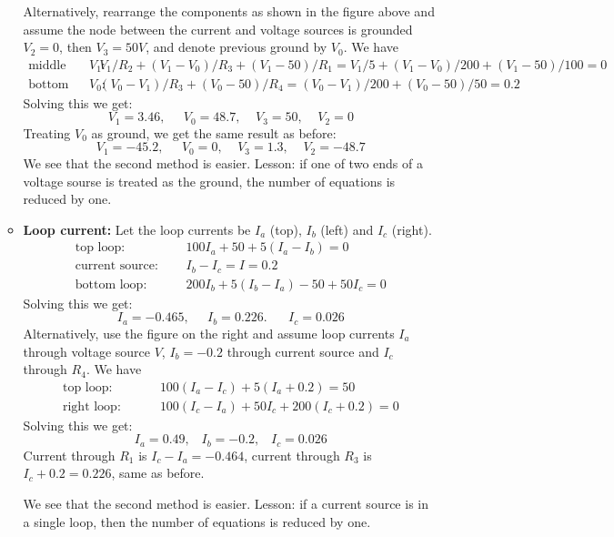 \begin{enumerate}
\begin{itemize}
    Alternatively, rearrange the components as shown in the figure 
    above and assume the node between the current and voltage sources
    is grounded $V_2=0$, then $V_3=50V$, and denote previous ground by
    $V_0$. We have 
    \[
    \begin{array}{ll}
      \mbox{middle node $V_1$:} & 
      V_1/R_2+(V_1-V_0)/R_3+(V_1-50)/R_1
      =V_1/5+(V_1-V_0)/200+(V_1-50)/100=0\\
      \mbox{bottom node $V_0$:} & (V_0-V_1)/R_3+(V_0-50)/R_4
      =(V_0-V_1)/200+(V_0-50)/50=0.2 
    \end{array} 
    \]
    Solving this we get: 
    \[
    V_1=3.46,\;\;\;\;\;V_0=48.7,\;\;\;\;V_3=50,\;\;\;\;V_2=0
    \]
    Treating $V_0$ as ground, we get the same result as before: 
    \[
    V_1=-45.2,\;\;\;\;\;V_0=0,\;\;\;\;V_3=1.3,\;\;\;\;V_2=-48.7 
    \]
    We see that the second method is easier. Lesson: if one of two ends 
    of a voltage sourse is treated as the ground, the number of equations 
    is reduced by one.
  \item {\bf Loop current:} Let the loop currents be $I_a$ (top), 
    $I_b$ (left) and $I_c$ (right). 
    \[
    \begin{array}{ll}
      \mbox{top loop:}\;\;\;\;\;\;& 100I_a+50+5(I_a-I_b)=0\\
      \mbox{current source:} \;\;\;\;\;& I_b-I_c=I=0.2\\
      \mbox{bottom loop:}\;\;\;\;\;\;& 200I_b+5(I_b-I_a)-50+50I_c=0 
    \end{array} 
    \]
    Solving this we get: 
    \[
    I_a=-0.465,\;\;\;\;\;I_b=0.226.\;\;\;\;\;\;I_c=0.026 
    \]
    Alternatively, use the figure on the right and assume loop currents 
    $I_a$ through voltage source $V$, $I_b=-0.2$ through current source and 
    $I_c$ through  $R_4$. We have 
    \[
    \begin{array}{ll}
      \mbox{top loop: }\;\;\;\;\;\;\;&100(I_a-I_c)+5(I_a+0.2)=50\\
      \mbox{right loop: }\;\;\;\;\;\;\;&100(I_c-I_a)+50I_c+200(I_c+0.2)=0 
    \end{array}
    \]
    Solving this we get: 
    \[
    I_a=0.49,\;\;\;I_b=-0.2,\;\;\;I_c=0.026 
    \]
    Current through $R_1$ is  $I_c-I_a=-0.464$, current through $R_3$ is 
    $I_c+0.2=0.226$, same as before.

    We see that the second method is easier. Lesson: if a current source 
    is in a single loop, then the number of equations is reduced by one.


\end{itemize}
\end{enumerate}
